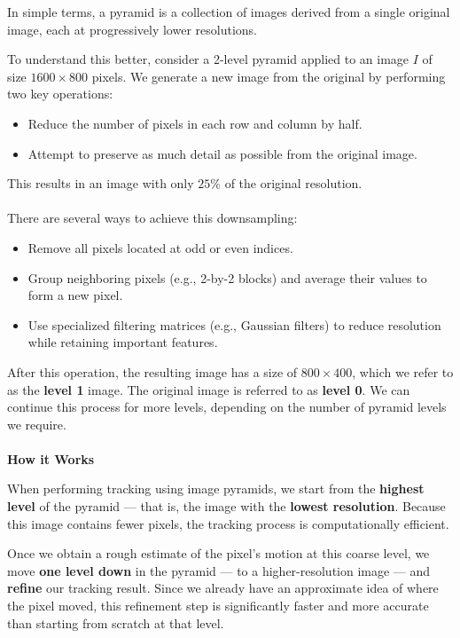 \documentclass[a4paper,12pt]{article}
\begin{document}
In simple terms, a pyramid is a collection of images derived from a single original image, each at progressively lower resolutions.

To understand this better, consider a 2-level pyramid applied to an image \( I \) of size \( 1600 \times 800 \) pixels. We generate a new image from the original by performing two key operations:

\begin{itemize}
    \item Reduce the number of pixels in each row and column by half.
    \item Attempt to preserve as much detail as possible from the original image.
\end{itemize}

This results in an image with only \( 25\% \) of the original resolution. \\ \\
There are several ways to achieve this downsampling:

\begin{itemize}
    \item Remove all pixels located at odd or even indices.
    \item Group neighboring pixels (e.g., 2-by-2 blocks) and average their values to form a new pixel.
    \item Use specialized filtering matrices (e.g., Gaussian filters) to reduce resolution while retaining important features.
\end{itemize}

After this operation, the resulting image has a size of \( 800 \times 400 \), which we refer to as the \textbf{level 1} image. The original image is referred to as \textbf{level 0}. We can continue this process for more levels, depending on the number of pyramid levels we require. \\ \\
\textbf{How it Works}

When performing tracking using image pyramids, we start from the \textbf{highest level} of the pyramid — that is, the image with the \textbf{lowest resolution}.  
Because this image contains fewer pixels, the tracking process is computationally efficient.

Once we obtain a rough estimate of the pixel's motion at this coarse level, we move \textbf{one level down} in the pyramid — to a higher-resolution image — and \textbf{refine} our tracking result.  
Since we already have an approximate idea of where the pixel moved, this refinement step is significantly faster and more accurate than starting from scratch at that level.
\end{document}
